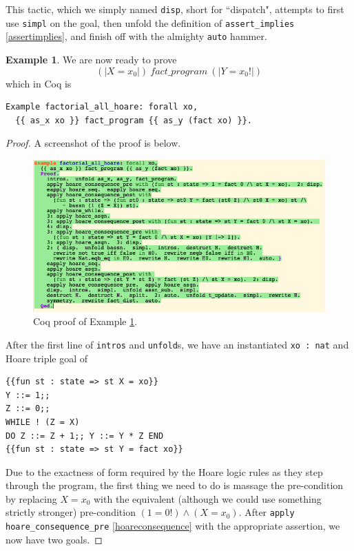 \documentclass[12pt,notitlepage]{report}
\theoremstyle{plain}
\theoremstyle{definition}
\newtheorem{example}[theo]{Example}
\numberwithin{equation}{section}
\begin{document}
This tactic, which we simply named \verb$disp$, short for ``dispatch", attempts to first use \verb$simpl$ on the goal, then unfold the definition of \verb$assert_implies$ \eqref{assertimplies}, and finish off with the almighty \verb$auto$ hammer.

\begin{example}\label{hoareexample1}
    We are now ready to prove
    \[
     (|X=x_0|)\ fact\_program\ (|Y=x_0!|)
    \]
    which in Coq is
    \begin{verbatim}
Example factorial_all_hoare: forall xo,
  {{ as_x xo }} fact_program {{ as_y (fact xo) }}.\end{verbatim}
    \begin{proof}
    A screenshot of the proof is below.
    
    \noindent        \begin{figure}[H]
        \centering
        \includegraphics[scale=0.6]{fact_hoare1}
        \caption{Coq proof of Example \ref{hoareexample1}.}
        \label{fig:hoareexample1}
        \end{figure}
    \par After the first line of \verb$intros$ and \verb$unfold$s, we have an instantiated \verb$xo : nat$ and Hoare triple goal of
    \begin{verbatim}
{{fun st : state => st X = xo}}
Y ::= 1;;
Z ::= 0;;
WHILE ! (Z = X)
DO Z ::= Z + 1;; Y ::= Y * Z END
{{fun st : state => st Y = fact xo}}\end{verbatim}
    Due to the exactness of form required by the Hoare logic rules as they step through the program, the first thing we need to do is massage the pre-condition by replacing $X = x_0$ with the equivalent (although we could use something strictly stronger) pre-condition $(1 = 0!) \land (X = x_0)$.  After \verb$apply hoare_consequence_pre$ \eqref{hoareconsequence} with the appropriate assertion, we now have two goals.

\end{proof}
\end{example}
\end{document}

